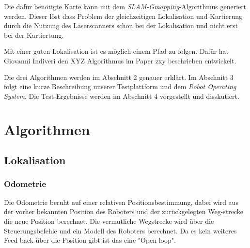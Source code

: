 \documentclass[11pt,a4paper]{article}
\begin{document}
	Die daf\"ur ben\"otigte Karte kann mit dem \textit{SLAM-Gmapping}-Algorithmus generiert werden. Dieser löst dass Problem der gleichzeitigen Lokalisation und Kartierung durch die Nutzung des Laserscanners schon bei der Lokalisation und nicht erst bei der Kartiertung.
	
	Mit einer guten Lokalisation ist es m\"oglich einem Pfad zu folgen. Daf\"ur hat Giovanni Indiveri den XYZ Algorithmus im Paper zxy beschrieben entwickelt. 


	Die drei Algorithmen werden im Abschnitt 2 genauer erkl\"art. Im Abschnitt 3 folgt eine kurze Beschreibung unserer Testplattform und dem \textit{Robot Operating System}. Die Test-Ergebnisse werden im Abschnitt 4 vorgestellt und disskutiert.
  
\newpage

\section{Algorithmen}

\subsection{Lokalisation}
\subsubsection{Odometrie}
{
	Die Odometrie beruht auf einer relativen Positionsbestimmung, dabei wird aus der vorher bekannten Position des Roboters und der zur\"uckgelegten Weg-strecke die neue Position berechnet. Die vermutliche Wegstrecke wird über die Steuerungsbefehle und ein Modell des Roboters berechnet. Da es kein weiteres Feed back über die Position gibt ist das eine "Open loop". 
}
\end{document}
